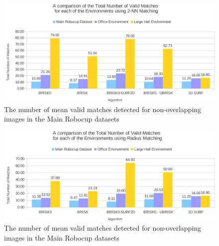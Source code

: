 \documentclass[11pt]{report}
\begin{document}
\begin{figure}
  \centering
    \includegraphics[width=1.0\textwidth]{../Drawings/Graphs/overall_nvm.pdf}
    \caption{The number of mean valid matches detected for non-overlapping images in the Main Robocup datasets} 
    \label{fig:overall_nvm}
\end{figure}

\begin{figure}
  \centering
    \includegraphics[width=1.0\textwidth]{../Drawings/Graphs/overall_nvm_radius.pdf}
    \caption{The number of mean valid matches detected for non-overlapping images in the Main Robocup datasets} 
    \label{fig:overall_nvm_radius}
\end{figure}
\end{document}
